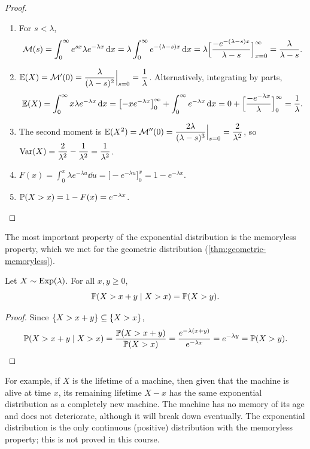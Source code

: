 \begin{proof}\leavevmode
\begin{enumerate}[leftmargin=*]
  \item[1.] For $s < \lambda$,
\[
  \mathcal{M}(s) = \int_0^\infty e^{sx} \lambda e^{-\lambda x} \mathop{}\!\mathrm{d} x = \lambda \int_0^\infty e^{-(\lambda - s)x} \mathop{}\!\mathrm{d} x = \lambda \Bigl[\frac{-e^{-(\lambda - s)x}}{\lambda - s}\Bigr]_{x=0}^\infty = \frac{\lambda}{\lambda - s}.
\]
  \item[2.] $\operatorname{\mathbb{E}}(X) = \mathcal{M}'(0) = \dfrac{\lambda}{(\lambda - s)^2}\Big|_{s=0} = \dfrac1\lambda$. Alternatively, integrating by parts,
\[
  \operatorname{\mathbb{E}}(X) = \int_0^\infty x \lambda e^{-\lambda x} \mathop{}\!\mathrm{d} x = \bigl[-x e^{-\lambda x}\bigr]_0^\infty + \int_0^\infty e^{-\lambda x} \mathop{}\!\mathrm{d} x = 0 + \Bigl[\frac{-e^{-\lambda x}}{\lambda}\Bigr]_0^\infty = \frac1\lambda.
\]
  \item[3.] The second moment is $\operatorname{\mathbb{E}}(X^2) = \mathcal{M}''(0) = \dfrac{2\lambda}{(\lambda - s)^3}\Big|_{s=0} = \dfrac{2}{\lambda^2}$, so $\operatorname{Var}(X) = \dfrac{2}{\lambda^2} - \dfrac{1}{\lambda^2} = \dfrac{1}{\lambda^2}$.
  \item[4.] $F(x) = \int_0^x \lambda e^{-\lambda u} \dd u = \bigl[-e^{-\lambda u}\bigr]_0^x = 1 - e^{-\lambda x}$.
  \item[5.] $\mathbb{P}(X > x) = 1 - F(x) = e^{-\lambda x}$. \qedhere
\end{enumerate}
\end{proof}

The most important property of the exponential distribution is the memoryless property, which we met for the geometric distribution (\cref{thm:geometric-memoryless}).

\begin{theorem}\label{thm:exponential-memoryless}
Let $X \sim \mathrm{Exp}(\lambda)$. For all $x, y \ge 0$,
\[
  \mathbb{P}(X > x + y \mid X > x) = \mathbb{P}(X > y).
\]
\end{theorem}

\begin{proof}
Since $\left\{ X > x + y \right\} \subseteq \left\{ X > x \right\}$,
\[
  \mathbb{P}(X > x + y \mid X > x) = \frac{\mathbb{P}(X > x + y)}{\mathbb{P}(X > x)} = \frac{e^{-\lambda(x+y)}}{e^{-\lambda x}} = e^{-\lambda y} = \mathbb{P}(X > y). \qedhere
\]
\end{proof}

For example, if $X$ is the lifetime of a machine, then given that the machine is alive at time $x$, its remaining lifetime $X - x$ has the same exponential distribution as a completely new machine. The machine has no memory of its age and does not deteriorate, although it will break down eventually. The exponential distribution is the only continuous (positive) distribution with the memoryless property; this is not proved in this course.

